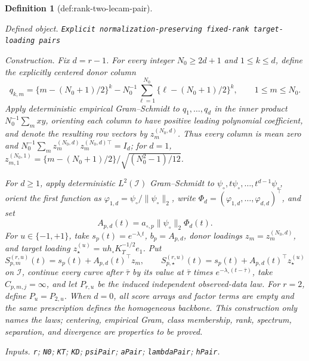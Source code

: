 \documentclass{article}
\newtheorem{definition}{Definition}
\begin{document}
\begin{definition}[def:rank-two-lecam-pair]\label{def:rank-two-lecam-pair}
\par\smallskip\noindent\emph{Defined object.} \texttt{Explicit normalization-\allowbreak{}preserving fixed-\allowbreak{}rank target-\allowbreak{}loading pairs}
\par\smallskip\noindent\emph{Construction.} Fix \(d=r-1\).  For every integer \(N_0\ge2d+1\) and \(1\le k\le d\), define the explicitly centered donor column
\[
 q_{k,m}=\{m-(N_0+1)/2\}^k-
 N_0^{-1}\sum_{\ell=1}^{N_0}\{\ell-(N_0+1)/2\}^k,
 \qquad 1\le m\le N_0.
\]
Apply deterministic empirical Gram--Schmidt to \(q_1,\ldots,q_d\) in the inner product \(N_0^{-1}\sum_m xy\), orienting each column to have positive leading polynomial coefficient, and denote the resulting row vectors by \(z_m^{(N_0,d)}\).  Thus every column is mean zero and \(N_0^{-1}\sum_m z_m^{(N_0,d)}z_m^{(N_0,d)\top}=I_d\); for \(d=1\), \(z_{m,1}^{(N_0,1)}=\{m-(N_0+1)/2\}/\sqrt{(N_0^2-1)/12}\).

For \(d\ge1\), apply deterministic \(L^2(\mathcal I)\) Gram--Schmidt to \(\psi_\circ,t\psi_\circ,\ldots,t^{d-1}\psi_\circ\), orient the first function as \(\varphi_{1,d}=\psi_\circ/\|\psi_\circ\|_2\), write \(\Phi_d=(\varphi_{1,d},\ldots,\varphi_{d,d})^\top\), and set
\[
 A_{p,d}(t)=a_{\circ,p}\|\psi_\circ\|_2\Phi_d(t).
\]
For \(u\in\{-1,+1\}\), take \(s_p(t)=e^{-\lambda_\circ t}\), \(b_p=A_{p,d}\), donor loadings \(z_m=z_m^{(N_0,d)}\), and target loading \(z_\star^{(u)}=u h_\circ K_T^{-1/2}e_1\).  Put
\[
 S_{p,m}^{(r,u)}(t)=s_p(t)+A_{p,d}(t)^\top z_m,
 \qquad
 S_{p,\star}^{(r,u)}(t)=s_p(t)+A_{p,d}(t)^\top z_\star^{(u)}
\]
on \(\mathcal I\), continue every curve after \(\bar\tau\) by its value at \(\bar\tau\) times \(e^{-\lambda_\circ(t-\bar\tau)}\), take \(C_{p,m,j}=\infty\), and let \(P_{r,u}\) be the induced independent observed-data law.  For \(r=2\), define \(P_u=P_{2,u}\).  When \(d=0\), all score arrays and factor terms are empty and the same prescription defines the homogeneous backbone.  This construction only names the laws; centering, empirical Gram, class membership, rank, spectrum, separation, and divergence are properties to be proved.
\par\smallskip\noindent\emph{Inputs.} \texttt{r}; \texttt{N0}; \texttt{KT}; \texttt{KD}; \texttt{psiPair}; \texttt{aPair}; \texttt{lambdaPair}; \texttt{hPair}.
\end{definition}
\end{document}
